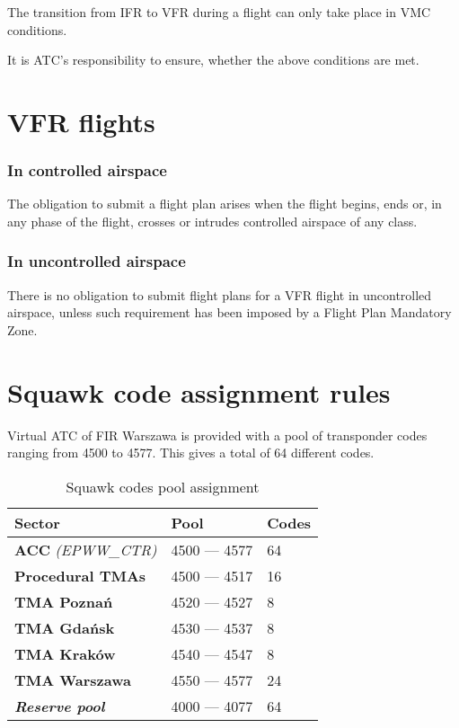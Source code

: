 The transition from IFR to VFR during a flight can only take place in VMC conditions.

It is ATC's responsibility to ensure, whether the above conditions are met.

\section{VFR flights}%

\subsubsection{In controlled airspace}
The obligation to submit a flight plan arises when the flight begins, ends or, in any phase of the flight, crosses or intrudes controlled airspace of any class.

\subsubsection{In uncontrolled airspace}
There is no obligation to submit flight plans for a VFR flight in uncontrolled airspace, unless such requirement has been imposed by a Flight Plan Mandatory Zone.

\section{Squawk code assignment rules}%
\label{sect:airspace:squawks}

Virtual ATC of FIR Warszawa is provided with a pool of transponder codes ranging from 4500 to 4577. This gives a total of 64 different codes.

\begin{table}[htbp]
    \centering
    \begin{tabular}{|l|l|l|}
        \rowcolor{vred}
        \color{white}\textbf Sector       & \color{white}\textbf Pool & \color{white}\textbf Codes \\\hline
        \textbf{ACC} \textit{(EPWW\_CTR)} & 4500 --- 4577             & 64                         \\\hline
        \textbf{Procedural TMAs}          & 4500 --- 4517             & 16                         \\\hline
        \textbf{TMA Poznań}               & 4520 --- 4527             & 8                          \\\hline
        \textbf{TMA Gdańsk}               & 4530 --- 4537             & 8                          \\\hline
        \textbf{TMA Kraków}               & 4540 --- 4547             & 8                          \\\hline
        \textbf{TMA Warszawa}             & 4550 --- 4577             & 24                         \\\hline
        \textit{\textbf{Reserve pool}}    & 4000 --- 4077             & 64                         \\\hline
    \end{tabular}
    \caption{Squawk codes pool assignment}
    \label{tbl:squawk}
\end{table}

